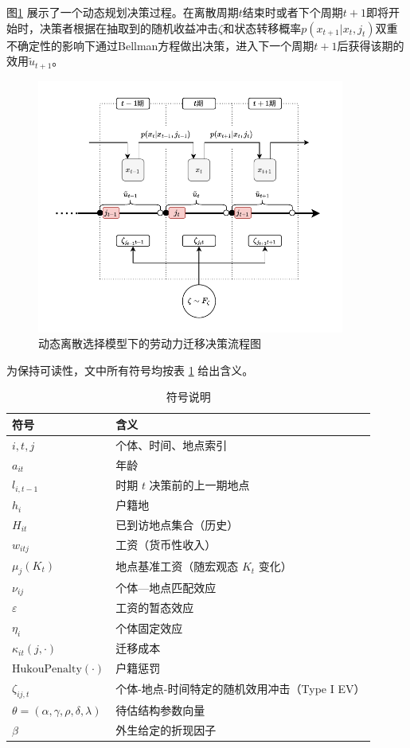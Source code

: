 \documentclass[
  a4paper,
  zihao=-4,
  fontset=mac,
  AutoFakeBold,
  AutoFakeSlant,
  oneside]{ctexbook}
\begin{document}
图\ref{fig:migration_flow_resized2} 展示了一个动态规划决策过程。在离散周期$t$结束时或者下个周期$t+1$即将开始时，决策者根据在抽取到的随机收益冲击$\zeta$和状态转移概率$p(x_{t+1}|x_t,j_t)$双重不确定性的影响下通过Bellman方程做出决策，进入下一个周期$t+1$后获得该期的效用$\tilde u_{t+1}$。

\begin{figure}[!ht]
\centering
\caption{动态离散选择模型下的劳动力迁移决策流程图}
\label{fig:migration_flow_resized2}
\includegraphics[width=0.9\textwidth]{images/dynamicsequence2.drawio.pdf}
\end{figure}


为保持可读性，文中所有符号均按表 \ref{tab:notation} 给出含义。
\begin{table}[ht]
\centering
\caption{符号说明}\label{tab:notation}
\begin{tabularx}{\textwidth}{lX}
\toprule
符号 & 含义 \\
\midrule
$i,t,j$ & 个体、时间、地点索引 \\
$a_{it}$ & 年龄 \\
$l_{i,t-1}$ & 时期 $t$ 决策前的上一期地点 \\
$h_i$ & 户籍地 \\
$H_{it}$ & 已到访地点集合（历史） \\
$w_{itj}$ & 工资（货币性收入） \\
$\mu_j(K_t)$ & 地点基准工资（随宏观态 $K_t$ 变化）\\
$\nu_{ij}$ & 个体—地点匹配效应\\
$\varepsilon$ & 工资的暂态效应\\
    $\eta_i$ & 个体固定效应 \\
    $\kappa_{it}(j,\cdot)$ & 迁移成本 \\
    $\mathrm{HukouPenalty}(\cdot)$ & 户籍惩罚 \\
    $\zeta_{ij,t}$ & 个体-地点-时间特定的随机效用冲击（Type I EV） \\
    $\theta=(\alpha, \gamma,\rho, \delta, \lambda)$ & 待估结构参数向量\\
    $\beta$ & 外生给定的折现因子 \\
\bottomrule
\end{tabularx}
\end{table}
\end{document}
